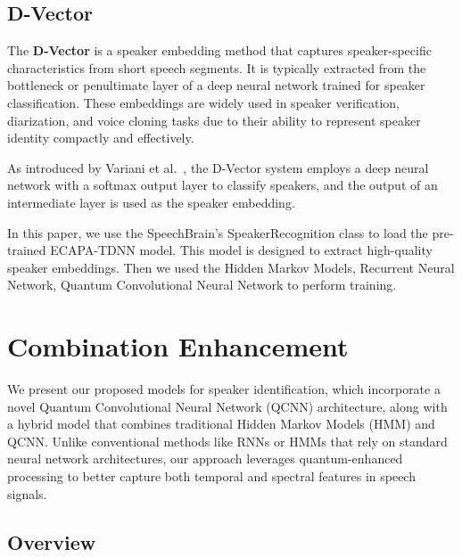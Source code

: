 \documentclass[conference]{IEEEtran}
\begin{document}
\subsection{D-Vector}

The \textbf{D-Vector} is a speaker embedding method that captures speaker-specific
characteristics from short speech segments. It is typically extracted from the
bottleneck or penultimate layer of a deep neural network trained for speaker
classification. These embeddings are widely used in speaker verification,
diarization, and voice cloning tasks due to their ability to represent speaker
identity compactly and effectively.

As introduced by Variani et al.~\cite{variani2014deep}, the D-Vector system employs
a deep neural network with a softmax output layer to classify speakers, and the
output of an intermediate layer is used as the speaker embedding.


In this paper, we use the SpeechBrain's SpeakerRecognition class to load the pre-trained
ECAPA-TDNN model. This model is designed to extract high-quality speaker embeddings.
Then we used the Hidden Markov Models, Recurrent Neural Network,
Quantum Convolutional Neural Network to perform training.










\section{Combination Enhancement}

We present our proposed models for speaker identification, which incorporate a novel Quantum Convolutional Neural Network (QCNN) architecture, along with a hybrid model that combines traditional Hidden Markov Models (HMM) and QCNN. Unlike conventional methods like RNNs or HMMs that rely on standard neural network architectures, our approach leverages quantum-enhanced processing to better capture both temporal and spectral features in speech signals.

\subsection{Overview}
\end{document}
